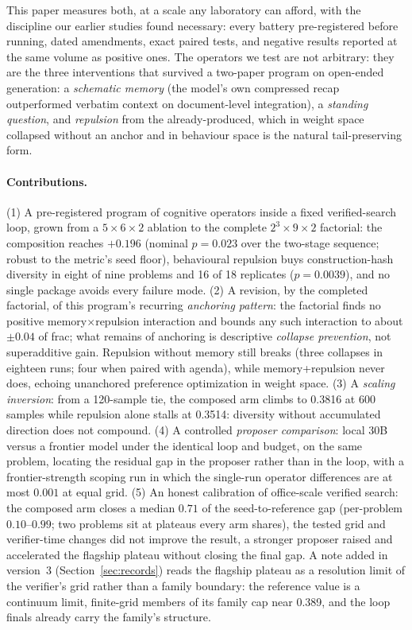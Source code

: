 \documentclass[11pt]{article}
\begin{document}
This paper measures both, at a scale any laboratory can afford, with the
discipline our earlier studies \citep{ono2026interrupting} found necessary:
every battery pre-registered before running, dated amendments, exact paired
tests, and negative results reported at the same volume as positive ones.
The operators we test are not arbitrary: they are the three interventions
that survived a two-paper program on open-ended generation: a
\emph{schematic memory} (the model's own compressed recap outperformed
verbatim context on document-level integration), a \emph{standing
question}, and \emph{repulsion} from the already-produced, which in weight
space collapsed without an anchor and in behaviour space is the natural
tail-preserving form.

\paragraph{Contributions.}
(1) A pre-registered program of cognitive operators inside a fixed
verified-search loop, grown from a $5{\times}6{\times}2$ ablation to the
complete $2^3{\times}9{\times}2$ factorial: the composition reaches
$+0.196$ (nominal $p=0.023$ over the two-stage sequence; robust to the
metric's seed floor), behavioural repulsion buys construction-hash
diversity in eight of nine problems and 16 of 18 replicates
($p=0.0039$), and no single package avoids every failure mode.
(2) A revision, by the completed factorial, of this program's recurring
\emph{anchoring pattern}: the factorial finds no positive
memory$\times$repulsion interaction and bounds any such interaction to
about $\pm 0.04$ of frac; what remains of anchoring is descriptive
\emph{collapse prevention}, not superadditive gain. Repulsion without memory still breaks (three
collapses in eighteen runs; four when paired with agenda), while
memory+repulsion never does, echoing unanchored preference optimization
in weight space.
(3) A \emph{scaling inversion}: from a 120-sample tie, the composed arm
climbs to 0.3816 at 600 samples while repulsion alone stalls at 0.3514:
diversity without accumulated direction does not compound.
(4) A controlled \emph{proposer comparison}: local 30B versus a frontier
model under the identical loop and budget, on the same problem,
locating the residual gap in the proposer rather than in the loop, with a
frontier-strength scoping run in which the single-run operator
differences are at most $0.001$ at equal grid.
(5) An honest calibration of office-scale verified search: the composed
arm closes a median $0.71$ of the seed-to-reference gap (per-problem
$0.10$--$0.99$; two problems sit at plateaus every arm shares), the
tested grid and verifier-time changes did not improve the result, a
stronger proposer raised and accelerated the flagship plateau without
closing the final gap. A note added in version~3
(Section~\ref{sec:records}) reads the flagship plateau as a resolution limit of the
verifier's grid rather than a family boundary: the reference value is a
continuum limit, finite-grid members of its family cap near 0.389, and the
loop finals already carry the family's structure.
\end{document}
